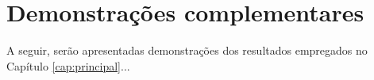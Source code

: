 \chapter{Demonstrações complementares}

A seguir, serão apresentadas demonstrações dos resultados empregados no Capítulo \ref{cap:principal}...
